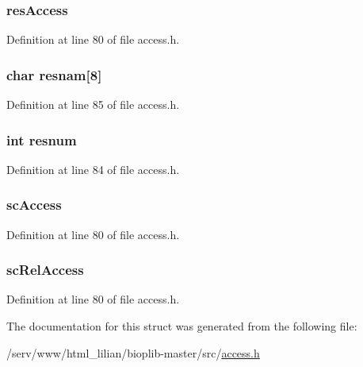 \hypertarget{struct__resaccess_af58b3cff49ed17901e3cc61df9f9207f}{
\subsubsection[{res\-Access}]{ res\-Access}}\label{struct__resaccess_af58b3cff49ed17901e3cc61df9f9207f}


Definition at line 80 of file access.\-h.

\hypertarget{struct__resaccess_a6f47476bfe0dd0abc0ade4a21127dfc2}{
\subsubsection[{resnam}]{\setlength{\rightskip}{0pt plus 5cm}char resnam\mbox{[}8\mbox{]}}}\label{struct__resaccess_a6f47476bfe0dd0abc0ade4a21127dfc2}


Definition at line 85 of file access.\-h.

\hypertarget{struct__resaccess_a7503a437042b8ae030eefb90decd7ceb}{
\subsubsection[{resnum}]{\setlength{\rightskip}{0pt plus 5cm}int resnum}}\label{struct__resaccess_a7503a437042b8ae030eefb90decd7ceb}


Definition at line 84 of file access.\-h.

\hypertarget{struct__resaccess_aced9ce5dd04c016c644ebbfcd3c6f293}{
\subsubsection[{sc\-Access}]{ sc\-Access}}\label{struct__resaccess_aced9ce5dd04c016c644ebbfcd3c6f293}


Definition at line 80 of file access.\-h.

\hypertarget{struct__resaccess_ab5564a493ae6f3c763ad98226c8e5c58}{
\subsubsection[{sc\-Rel\-Access}]{ sc\-Rel\-Access}}\label{struct__resaccess_ab5564a493ae6f3c763ad98226c8e5c58}


Definition at line 80 of file access.\-h.



The documentation for this struct was generated from the following file\-:\begin{DoxyCompactItemize}
\item 
/serv/www/html\-\_\-lilian/bioplib-\/master/src/\hyperlink{access_8h}{access.\-h}\end{DoxyCompactItemize}
